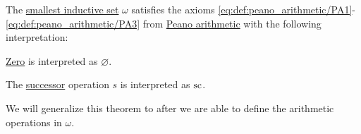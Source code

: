 \begin{theorem}\label{thm:omega_is_model_of_pa_without_operations}
  The \hyperref[thm:smallest_inductive_set_existence]{smallest inductive set} \( \omega \) satisfies the axioms \eqref{eq:def:peano_arithmetic/PA1}-\eqref{eq:def:peano_arithmetic/PA3} from \hyperref[def:peano_arithmetic]{Peano arithmetic} with the following interpretation:
  \begin{thmenum}
     \hyperref[def:peano_arithmetic/zero]{Zero} is interpreted as \( \varnothing \).

     The \hyperref[def:peano_arithmetic/succ]{successor} operation \( s \) is interpreted as \( \op{sc} \).
  \end{thmenum}

  We will generalize this theorem to  after we are able to define the arithmetic operations in \( \omega \).
\end{theorem}
